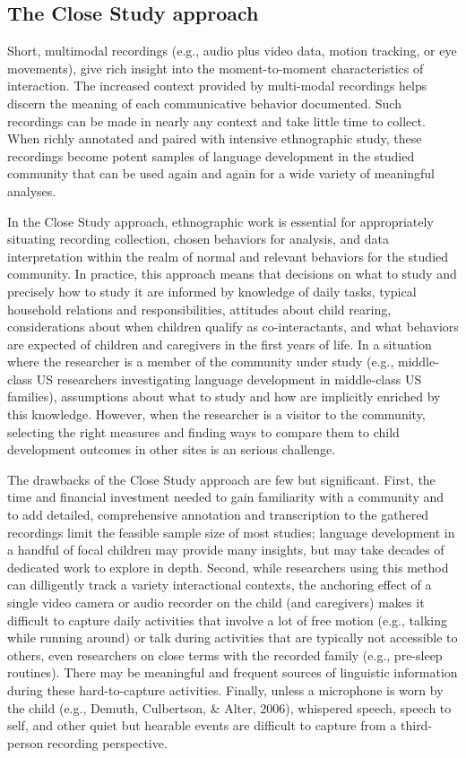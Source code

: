\documentclass[,man,floatsintext]{apa6}
\begin{document}
\subsection{The Close Study approach}\label{the-close-study-approach}

Short, multimodal recordings (e.g., audio plus video data, motion
tracking, or eye movements), give rich insight into the moment-to-moment
characteristics of interaction. The increased context provided by
multi-modal recordings helps discern the meaning of each communicative
behavior documented. Such recordings can be made in nearly any context
and take little time to collect. When richly annotated and paired with
intensive ethnographic study, these recordings become potent samples of
language development in the studied community that can be used again and
again for a wide variety of meaningful analyses.

In the Close Study approach, ethnographic work is essential for
appropriately situating recording collection, chosen behaviors for
analysis, and data interpretation within the realm of normal and
relevant behaviors for the studied community. In practice, this approach
means that decisions on what to study and precisely how to study it are
informed by knowledge of daily tasks, typical household relations and
responsibilities, attitudes about child rearing, considerations about
when children qualify as co-interactants, and what behaviors are
expected of children and caregivers in the first years of life. In a
situation where the researcher is a member of the community under study
(e.g., middle-class US researchers investigating language development in
middle-class US families), assumptions about what to study and how are
implicitly enriched by this knowledge. However, when the researcher is a
visitor to the community, selecting the right measures and finding ways
to compare them to child development outcomes in other sites is an
serious challenge.

The drawbacks of the Close Study approach are few but significant.
First, the time and financial investment needed to gain familiarity with
a community and to add detailed, comprehensive annotation and
transcription to the gathered recordings limit the feasible sample size
of most studies; language development in a handful of focal children may
provide many insights, but may take decades of dedicated work to explore
in depth. Second, while researchers using this method can dilligently
track a variety interactional contexts, the anchoring effect of a single
video camera or audio recorder on the child (and caregivers) makes it
difficult to capture daily activities that involve a lot of free motion
(e.g., talking while running around) or talk during activities that are
typically not accessible to others, even researchers on close terms with
the recorded family (e.g., pre-sleep routines). There may be meaningful
and frequent sources of linguistic information during these
hard-to-capture activities. Finally, unless a microphone is worn by the
child (e.g., Demuth, Culbertson, \& Alter, 2006), whispered speech,
speech to self, and other quiet but hearable events are difficult to
capture from a third-person recording perspective.
\end{document}
